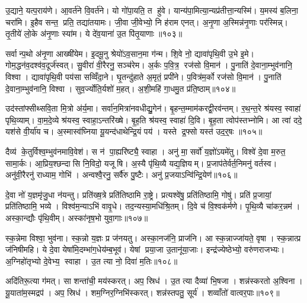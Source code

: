 उ॒द्याने॒ यत्प॒राय॑णे। आ॒वर्त॑ने वि॒वर्त॑ने। यो गो॑पा॒यति॒ त हु॑वे। यान्य॑पा॒मित्या॒न्यप्र॑तीत्ता॒न्यस्मि॑। य॒मस्य॑ ब॒लिना॒ चरा॑मि। इ॒हैव सन्त॒ प्रति॒ तद्या॑तयामः। जी॒वा जी॒वेभ्यो॒ नि ह॑राम एनत्। अ॒नृ॒णा अ॒स्मिन्न॑नृ॒णाः पर॑स्मिन्न्। तृ॒तीये॑ लो॒के अ॑नृ॒णाः स्या॑म। ये दे॑व॒याना॑ उ॒त पि॑तृ॒याणाः॥१०३॥

सर्वान्प॒थो अ॑नृ॒णा आख्षी॑येम। इ॒दमू॒नु श्रेयो॑ऽव॒सान॒मा ग॑न्म। शि॒वे नो॒ द्यावा॑पृथि॒वी उ॒भे इ॒मे। गोम॒द्धन॑व॒दश्व॑व॒दूर्ज॑स्वत्। सु॒वीरा॑ वी॒रैरनु॒ सञ्च॑रेम। अ॒र्कः प॒वि॒त्र॒ रज॑सो वि॒मान॑। पु॒नाति॑ दे॒वाना॒म्भुव॑नानि॒ विश्वा। द्यावा॑पृथि॒वी पय॑सा सव्विँदा॒ने। घृ॒तन्दु॑हाते अ॒मृतं॒ प्रपी॑ने। प॒वित्र॑म॒र्को रज॑सो वि॒मान॑। पु॒नाति॑ दे॒वाना॒म्भुव॑नानि॒ विश्वा। सुव॒र्ज्योति॒र्यशो॑ म॒हत्। अ॒शी॒महि॑ गा॒धमु॒त प्र॑ति॒ष्ठाम्॥१०४॥\anuvakamend[चा॒त॒य॒त॒ श्री॒णी॒ता॒ स॒त्यमा॒हुर॑शीमहि ग॒णे कु॑रु वि॒द्रव॑णे पितृ॒याणा॑ अ॒र्को रज॑सो वि॒मान॒स्त्रीणि॑ च]

उद॑स्तांफ्सीथ्सवि॒ता मि॒त्रो अ॑र्य॒मा। सर्वा॑न॒मित्रा॑नवधीद्यु॒गेन॑। बृ॒हन्त॒म्माम॑करद्वी॒रव॑न्तम्। र॒थ॒न्त॒रे श्र॑यस्व॒ स्वाहा॑ पृथि॒व्याम्। वा॒म॒दे॒व्ये श्र॑यस्व॒ स्वाहा॒ऽन्तरि॑ख्षे। बृ॒ह॒ति श्र॑यस्व॒ स्वाहा॑ दि॒वि। बृ॒ह॒ता त्वोप॑स्तभ्नोमि। आ त्वा॑ ददे॒ यश॑से वी॒र्या॑य च। अ॒स्मास्व॑घ्निया यू॒यन्द॑धाथेन्द्रि॒यं पय॑। यस्ते द्र॒फ्सो यस्त॑ उद॒र्॒षः ॥१०५॥

दैव्य॑ के॒तुर्विश्व॒म्भुव॑नमावि॒वेश॑। स न॑ पा॒ह्यरि॑ष्ट्यै॒ स्वाहा। अनु॑ मा॒ सर्वो॑ य॒ज्ञो॑ऽयमे॑तु। विश्वे॑ दे॒वा म॒रुत॒ सामा॒र्कः। आ॒प्रिय॒श्छन्दासि नि॒विदो॒ यजूषि। अ॒स्यै पृ॑थि॒व्यै यद्य॒ज्ञियम्। प्र॒जाप॑तेर्वर्त॒निमनु॑ वर्तस्व। अनु॑वी॒रैरनु॑ राध्याम॒ गोभि॑। अन्वश्वै॒रनु॒ सर्वै॑रु पु॒ष्टैः। अनु॑ प्र॒जयाऽन्वि॑न्द्रि॒येण॑॥१०६॥

दे॒वा नो॑ य॒ज्ञमृ॑जु॒धा न॑यन्तु। प्रति॑ख्ष॒त्रे प्रति॑तिष्ठामि रा॒ष्ट्रे। प्रत्यश्वे॑षु॒ प्रति॑तिष्ठामि॒ गोषु॑। प्रति॑ प्र॒जायां॒ प्रति॑तिष्ठामि॒ भव्ये। विश्व॑म॒न्याऽभि॑ वावृ॒धे। तद॒न्यस्या॒मधि॑श्रि॒तम्। दि॒वे च॑ वि॒श्वक॑र्मणे। पृ॒थि॒व्यै चा॑कर॒न्नम॑। अस्का॒न्द्यौः पृ॑थि॒वीम्। अस्का॑नृष॒भो युवा॒गाः॥१०७॥

स्क॒न्नेमा विश्वा॒ भुव॑ना। स्क॒न्नो य॒ज्ञः प्र ज॑नयतु। अस्का॒नज॑नि॒ प्राज॑नि। आ स्क॒न्नाज्जा॑यते॒ वृषा। स्क॒न्नात्प्र ज॑निषीमहि। ये दे॒वा येषा॑मि॒दम्भा॑ग॒धेय॑म्ब॒भूव॑। येषां प्रया॒जा उ॒तानू॑या॒जाः। इन्द्र॑ज्येष्ठेभ्यो॒ वरु॑णराजभ्यः। अ॒ग्निहो॑तृभ्यो दे॒वेभ्य॒ स्वाहा। उ॒त त्या नो॒ दिवा॑ म॒तिः॥१०८॥

अदि॑तिरू॒त्या ग॑मत्। सा शन्ता॑ची॒ मय॑स्करत्। अप॒ स्रिध॑। उ॒त त्या दैव्या॑ भि॒षजा। शन्न॑स्करतो अ॒श्विना। यू॒याता॑म॒स्मद्रप॑। अप॒ स्रिध॑। शम॒ग्निर॒ग्निभि॑स्करत्। शन्न॑स्तपतु॒ सूर्य॑। शव्वाँतो॑ वात्वर॒पाः॥१०९॥

